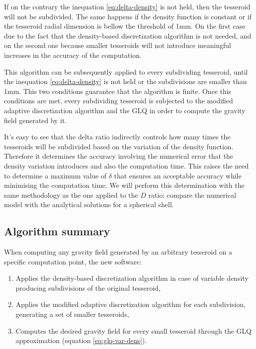 \documentclass[extra]{gji}
\begin{document}
If on the contrary the inequation \ref{eq:delta-density} is not held, then the tesseroid will not be subdivided.
The same happens if the density function is constant or if the tesseroid radial dimension is bellow the threshold of 1mm.
On the first case due to the fact that the density-based discretization algorithm is not needed, and on the second one because smaller tesseroids will not introduce meaningful increases in the accuracy of the computation.

This algorithm can be subsequently applied to every subdividing tesseroid, until the inequation \ref{eq:delta-density} is not held or the subdivisions are smaller than 1mm.
This two conditions guarantee that the algorithm is finite.
Once this conditions are met, every subdividing tesseroid is subjected to the modified adaptive discretization algorithm and the GLQ in order to compute the gravity field generated by it.

It's easy to see that the delta ratio indirectly controls how many times the tesseroids will be subdivided based on the variation of the density function.
Therefore it determines the accuracy involving the numerical error that the density variation introduces and also the computation time.
This raises the need to determine a maximum value of $\delta$ that ensures an acceptable accuracy while minimising the computation time.
We will perform this determination with the same methodology as the one applied to the $D$ ratio: compare the numerical model with the analytical solutions for a spherical shell.


\subsection{Algorithm summary}

When computing any gravity field generated by an arbitrary tesseroid on a specific computation point, the new software:

\begin{enumerate}
    \renewcommand{\theenumi}{(\arabic{enumi})}
    \item Applies the density-based discretization algorithm in case of variable density producing subdivisions of the original tesseroid,
    \item Applies the modified adaptive discretization algorithm for each subdivision, generating a set of smaller tesseroids,
    \item Computes the desired gravity field for every small tesseroid through the GLQ approximation (equation \ref{eq:glq-var-dens}).
\end{enumerate}
\end{document}
